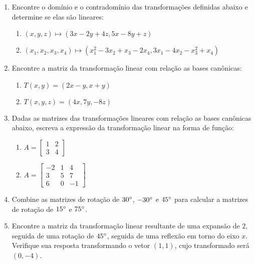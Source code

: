 \documentclass{article}
\begin{document}
\begin{enumerate}
\item Encontre o dom\'inio e o contradom\'inio das transforma\c{c}\~oes definidas abaixo
	e determine se elas s\~ao lineares:
	\begin{enumerate}
		\item $(x, y, z) \mapsto (3x-2y+4z, 5x-8y+z)$
		\item $(x_1, x_2, x_3, x_4) \mapsto (x_1^2-3x_2+x_3-2x_4, 3x_1-4x_2-x_3^2+x_4)$
	\end{enumerate}

\item Encontre a matriz da transforma\c{c}\~ao linear com rela\c{c}\~ao as bases can\^onicas:
	\begin{enumerate}
		\item $T(x, y) = (2x-y, x+y)$
		\item $T(x, y, z) = (4x, 7y, -8z)$
	\end{enumerate}

\item Dadas as matrizes das transforma\c{c}\~oes lineares com rela\c{c}\~ao as bases
	can\^onicas abaixo, escreva a express\~ao da transforma\c{c}\~ao linear na forma de
	fun\c{c}\~ao:
	\begin{enumerate}
		\item $A = \left[
				\begin{array}{cc}
					1 & 2 \\
					3 & 4
				\end{array}\right]$
		\item $A = \left[
				\begin{array}{ccc}
					-2 & 1 & 4 \\
					3 & 5 & 7 \\
					6 & 0 & -1
				\end{array}\right]$
	\end{enumerate}

\item Combine as matrizes de rota\c{c}\~ao de $30\degree$, $-30\degree$ e $45\degree$ para calcular a matrizes de
	rota\c{c}\~ao de $15\degree$ e $75\degree$.

\item Encontre a matriz da transforma\c{c}\~ao linear resultante de uma expans\~ao de
	$2$, seguida de uma rota\c{c}\~ao de $45\degree$, seguida de uma reflex\~ao em
	torno do eixo $x$. Verifique sua resposta transformando o vetor $(1, 1)$,
	cujo transformado ser\'a $(0, -4)$.


\end{enumerate}
\end{document}
